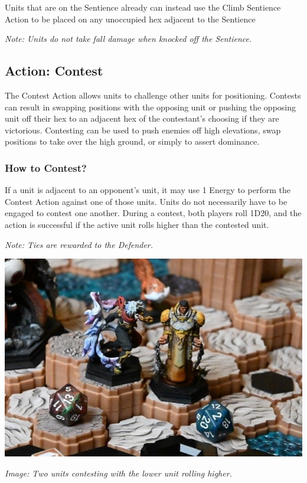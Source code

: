 \documentclass[../main.tex]{subfiles}
\begin{document}
Units that are on the Sentience already can instead use the Climb Sentience Action to be placed on any unoccupied hex adjacent to the Sentience

\textit{Note: Units do not take fall damage when knocked off the Sentience.}

\subsection{Action: Contest}
The Contest Action allows units to challenge other units for positioning. Contests can result in swapping positions with the opposing unit or pushing the opposing unit off their hex to an adjacent hex of the contestant’s choosing if they are victorious. Contesting can be used to push enemies off high elevations, swap positions to take over the high ground, or simply to assert dominance.

\subsubsection{How to Contest? }
If a unit is adjacent to an opponent’s unit, it may use 1 Energy to perform the Contest Action against one of those units. Units do not necessarily have to be engaged to contest one another. During a contest, both players roll 1D20, and the action is successful if the active unit rolls higher than the contested unit.

\textit{Note: Ties are rewarded to the Defender.}

\centering
    \includegraphics[width=1\linewidth]{chapters//ActionsandEnergy/TimeStrikeContesting.jpg}

\textit{Image: Two units contesting with the lower unit rolling higher.}
\end{document}
